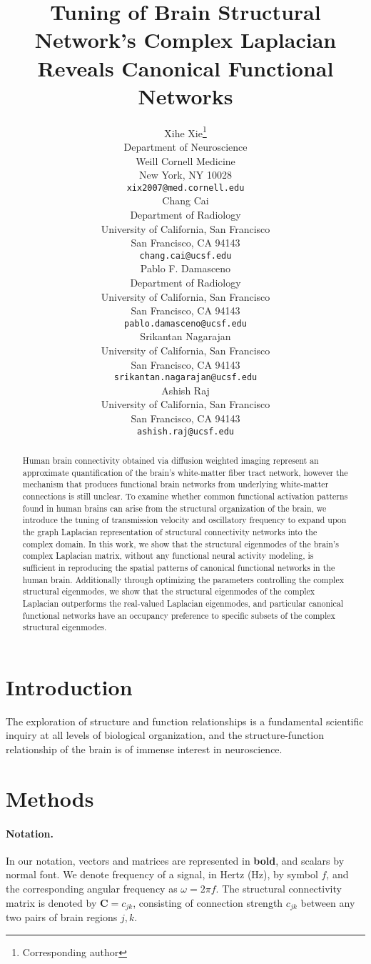 \documentclass{article}
\title{Tuning of Brain Structural Network's Complex Laplacian Reveals Canonical Functional Networks}
\author{
  Xihe Xie\thanks{Corresponding author} \\
  Department of Neuroscience\\
  Weill Cornell Medicine\\
  New York, NY 10028 \\
  \texttt{xix2007@med.cornell.edu} \\
   \And
  Chang Cai \\
  Department of Radiology\\
  University of California, San Francisco\\
  San Francisco, CA 94143\\
  \texttt{chang.cai@ucsf.edu} \\
   \And
  Pablo F. Damasceno \\
  Department of Radiology\\
  University of California, San Francisco\\
  San Francisco, CA 94143\\
  \texttt{pablo.damasceno@ucsf.edu}\\
  \And
  Srikantan Nagarajan \\
  University of California, San Francisco\\
  San Francisco, CA 94143\\
  \texttt{srikantan.nagarajan@ucsf.edu} \\
  \And
  Ashish Raj \\
  University of California, San Francisco\\
  San Francisco, CA 94143\\
  \texttt{ashish.raj@ucsf.edu} \\
}
\begin{document}
\maketitle

\begin{abstract}
Human brain connectivity obtained via diffusion weighted imaging represent an approximate quantification of the brain's white-matter fiber tract network, however the mechanism that produces functional brain networks from underlying white-matter connections is still unclear. To examine whether common functional activation patterns found in human brains can arise from the structural organization of the brain, we introduce the tuning of transmission velocity and oscillatory frequency to expand upon the graph Laplacian representation of structural connectivity networks into the complex domain. In this work, we show that the structural eigenmodes of the brain's complex Laplacian matrix, without any functional neural activity modeling, is sufficient in reproducing the spatial patterns of canonical functional networks in the human brain. Additionally through optimizing the parameters controlling the complex structural eigenmodes, we show that the structural eigenmodes of the complex Laplacian outperforms the real-valued Laplacian eigenmodes, and particular canonical functional networks have an occupancy preference to specific subsets of the complex structural eigenmodes.
\end{abstract}




\section{Introduction}
The exploration of structure and function relationships is a fundamental scientific inquiry at all levels of biological organization, and the structure-function relationship of the brain is of immense interest in neuroscience. 


\section{Methods}
\label{sec:methods}

\paragraph{Notation.} In our notation, vectors and matrices are represented in \textbf{bold}, and scalars by normal font. We denote frequency of a signal, in Hertz (Hz), by symbol $f$, and the corresponding angular frequency as $\omega = 2 \pi f$. The structural connectivity matrix is denoted by $\bm{C} = c_{jk}$, consisting of connection strength $c_{jk}$ between any two pairs of brain regions $j,k$.
\end{document}
